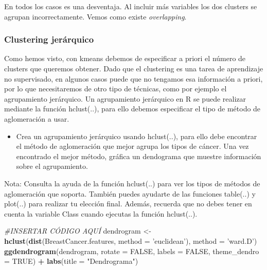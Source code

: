 \documentclass[]{article}
\newenvironment{Shaded}{\begin{snugshade}}{\end{snugshade}}
\newcommand{\CommentTok}[1]{\textcolor[rgb]{0.56,0.35,0.01}{\textit{#1}}}
\newcommand{\DataTypeTok}[1]{\textcolor[rgb]{0.13,0.29,0.53}{#1}}
\newcommand{\KeywordTok}[1]{\textcolor[rgb]{0.13,0.29,0.53}{\textbf{#1}}}
\newcommand{\NormalTok}[1]{#1}
\newcommand{\OperatorTok}[1]{\textcolor[rgb]{0.81,0.36,0.00}{\textbf{#1}}}
\newcommand{\OtherTok}[1]{\textcolor[rgb]{0.56,0.35,0.01}{#1}}
\newcommand{\StringTok}[1]{\textcolor[rgb]{0.31,0.60,0.02}{#1}}
\providecommand{\tightlist}{%
  \setlength{\itemsep}{0pt}\setlength{\parskip}{0pt}}
\begin{document}
En todos los casos es una desventaja. Al incluir más variables los dos
clusters se agrupan incorrectamente. Vemos como existe
\emph{overlapping}.

\hypertarget{clustering-jeruxe1rquico}{%
\subsubsection{Clustering jerárquico}\label{clustering-jeruxe1rquico}}

Como hemos visto, con kmeans debemos de especificar a priori el número
de clusters que queremos obtener. Dado que el clustering es una tarea de
aprendizaje no supervisado, en algunos casos puede que no tengamos esa
información a priori, por lo que necesitaremos de otro tipo de técnicas,
como por ejemplo el agrupamiento jerárquico. Un agrupamiento jerárquico
en R se puede realizar mediante la función hclust(..), para ello debemos
especificar el tipo de método de aglomeración a usar.

\begin{itemize}
\tightlist
\item
  Crea un agrupamiento jerárquico usando hclust(..), para ello debe
  encontrar el método de aglomeración que mejor agrupa los tipos de
  cáncer. Una vez encontrado el mejor método, gráfica un dendograma que
  muestre información sobre el agrupamiento.
\end{itemize}

Nota: Consulta la ayuda de la función hclust(..) para ver los tipos de
métodos de aglomeración que soporta. También puedes ayudarte de las
funciones table(..) y plot(..) para realizar tu elección final. Además,
recuerda que no debes tener en cuenta la variable Class cuando ejecutas
la función hclust(..).

\begin{Shaded}
\begin{Highlighting}[]
\CommentTok{#INSERTAR CÓDIGO AQUÍ}
\NormalTok{dendrogram <-}\StringTok{ }\KeywordTok{hclust}\NormalTok{(}\KeywordTok{dist}\NormalTok{(BreastCancer.features, }\DataTypeTok{method =} \StringTok{'euclidean'}\NormalTok{), }\DataTypeTok{method =} \StringTok{'ward.D'}\NormalTok{)}
\KeywordTok{ggdendrogram}\NormalTok{(dendrogram, }\DataTypeTok{rotate =} \OtherTok{FALSE}\NormalTok{, }\DataTypeTok{labels =} \OtherTok{FALSE}\NormalTok{, }\DataTypeTok{theme_dendro =} \OtherTok{TRUE}\NormalTok{) }\OperatorTok{+}\StringTok{ }\KeywordTok{labs}\NormalTok{(}\DataTypeTok{title =} \StringTok{"Dendrograma"}\NormalTok{)}
\end{Highlighting}
\end{Shaded}
\end{document}
